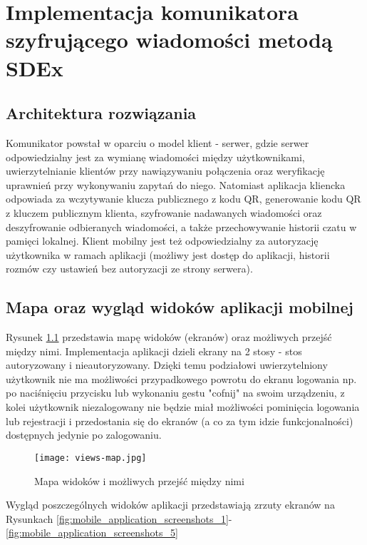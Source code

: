 \documentclass[../main.tex]{subfiles}
\begin{document}
\chapter{Implementacja komunikatora szyfrującego wiadomości metodą SDEx}

\section{Architektura rozwiązania}
Komunikator powstał w oparciu o model klient - serwer, gdzie serwer odpowiedzialny jest za wymianę wiadomości między użytkownikami, uwierzytelnianie klientów przy nawiązywaniu połączenia oraz weryfikację uprawnień przy wykonywaniu zapytań do niego. Natomiast aplikacja kliencka odpowiada za wczytywanie klucza publicznego z kodu QR, generowanie kodu QR z kluczem publicznym klienta, szyfrowanie nadawanych wiadomości oraz deszyfrowanie odbieranych wiadomości, a także przechowywanie historii czatu w pamięci lokalnej. Klient mobilny jest też odpowiedzialny za autoryzację użytkownika w ramach aplikacji (możliwy jest dostęp do aplikacji, historii rozmów czy ustawień bez autoryzacji ze strony serwera).

\section{Mapa oraz wygląd widoków aplikacji mobilnej}
Rysunek \ref{fig:mobile_application_views_map} przedstawia mapę widoków (ekranów) oraz możliwych przejść między nimi. Implementacja aplikacji dzieli ekrany na 2 stosy - stos autoryzowany i nieautoryzowany. Dzięki temu podziałowi uwierzytelniony użytkownik nie ma możliwości przypadkowego powrotu do ekranu logowania np. po naciśnięciu przycisku lub wykonaniu gestu "cofnij" na swoim urządzeniu, z kolei użytkownik niezalogowany nie będzie miał możliwości pominięcia logowania lub rejestracji i przedostania się do ekranów (a co za tym idzie funkcjonalności) dostępnych jedynie po zalogowaniu.

\begin{figure}[H]
	\centering
	\texttt{[image: views-map.jpg]}
	\caption{Mapa widoków i możliwych przejść między nimi}
	\label{fig:mobile_application_views_map}
\end{figure}

Wygląd poszczególnych widoków aplikacji przedstawiają zrzuty ekranów na Rysunkach \ref{fig:mobile_application_screenshots_1}-\ref{fig:mobile_application_screenshots_5}
\end{document}
